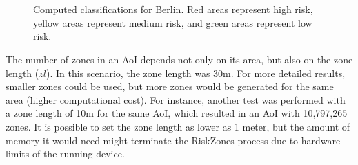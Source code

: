 \begin{refsection}
\begin{figure}[!htb]
  \centering
  \\
  \\
  \caption{Computed classifications for Berlin. Red areas represent high risk, yellow areas represent medium risk, and green areas represent low risk.}
\end{figure}

The number of zones in an AoI depends not only on its area, but also on the zone length ($zl$). In this scenario, the zone length was 30m. For more detailed results, smaller zones could be used, but more zones would be generated for the same area (higher computational cost). For instance, another test was performed with a zone length of 10m for the same AoI, which resulted in an AoI with 10,797,265 zones. It is possible to set the zone length as lower as 1 meter, but the amount of memory it would need might terminate the RiskZones process due to hardware limits of the running device.


\end{refsection}
